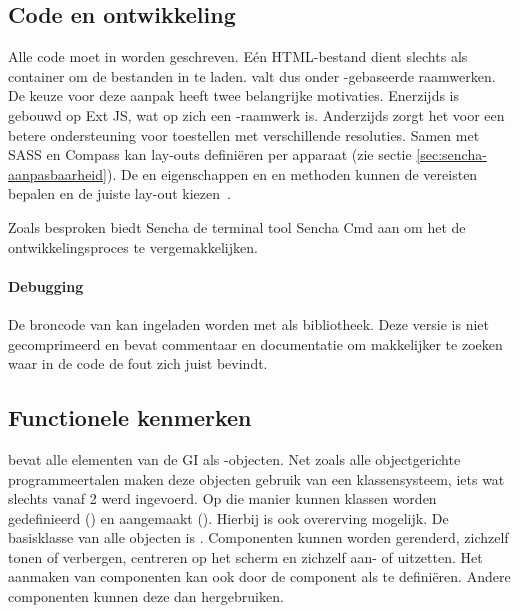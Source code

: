 \subsection{Code en ontwikkeling}
Alle code moet in \js{} worden geschreven.
Eén HTML-bestand dient slechts als container om de bestanden in te laden.  
\st{} valt dus onder \js{}-gebaseerde raamwerken.  
De keuze voor deze aanpak heeft twee belangrijke motivaties.  
Enerzijds is \st{} gebouwd op Ext JS,  wat op zich een \js{}-raamwerk is. 
Anderzijds zorgt het voor een betere ondersteuning voor toestellen met verschillende resoluties.  
Samen met SASS en Compass kan \st{} lay-outs definiëren per apparaat (zie sectie \ref{sec:sencha-aanpasbaarheid}).  
De  en  eigenschappen en  en  methoden kunnen de vereisten bepalen en de juiste lay-out kiezen~\cite{JohnEClark2012}.

Zoals besproken biedt Sencha de terminal tool Sencha Cmd aan om het de ontwikkelingsproces te vergemakkelijken.  

\paragraph{Debugging}
De broncode van \st{} kan ingeladen worden met  als bibliotheek.  
Deze versie is niet gecomprimeerd en bevat commentaar en documentatie om makkelijker te zoeken waar in de code de fout zich juist bevindt.

\subsection{Functionele kenmerken}
\st{} bevat alle elementen van de GI als \js{}-objecten.  
Net zoals alle objectgerichte programmeertalen maken deze objecten gebruik van een klassensysteem,  iets wat slechts vanaf \st{} 2 werd ingevoerd.  
Op die manier kunnen klassen worden gedefinieerd () en aangemaakt ().  
Hierbij is ook overerving mogelijk.  
De basisklasse van alle objecten is .  
Componenten kunnen worden gerenderd, zichzelf tonen of verbergen,  centreren op het scherm en zichzelf aan- of uitzetten.   
Het aanmaken van componenten kan ook door de component als  te definiëren.  
Andere componenten kunnen deze  dan hergebruiken.

